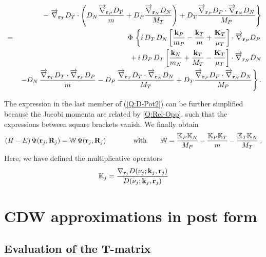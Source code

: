 \begin{eqnarray}
&&- \left. \overrightarrow{\nabla}_{\mathbf{r}_{T}} D_{T} \cdot \left(D_{N}
\frac{\overrightarrow{\nabla}_{\mathbf{r}_{P}}D_{P}}{m} + D_{P} \frac{
\overrightarrow{\nabla}_{\mathbf{r}_{N}} D_{N}}{M_{T}} \right)+ D_{T}
\frac{\overrightarrow{\nabla}_{\mathbf{r}_{P}} D_{P} \cdot
\overrightarrow{\nabla}_{\mathbf{r}_{N}}D_{N}}{M_{P}} \right\} \nonumber
\\
&=& \Phi \, \left\{i \, D_{T} \,  D_{N} \left[ \frac{
\mathbf{k}_{P}}{m_{P}} - \frac{ \mathbf{k}_{T} }{m} + \frac{
\mathbf{K}_{T}}{\mu_{T}} \right] \cdot \overrightarrow{\nabla}_{\mathbf{r}_{P}}
D_{P} \right.\nonumber
\\
&&+ \, i \, D_{P} \, D_{T}\left[ \frac{\mathbf{k}_{N} }{m_{N}} +
\frac{\mathbf{k}_{T} }{M_{T}} - \frac{\mathbf{K}_{T} }{\mu_{T}} \right] \cdot
\overrightarrow{\nabla}_{\mathbf{r}_{N}} D_{N} \nonumber
\\
&& \left. - D_{N} \,\frac{\overrightarrow{\nabla}_{\mathbf{r}_{T}} D_{T}
\cdot \overrightarrow{\nabla}_{\mathbf{r}_{P}} D_{P}}{m} - D_{P}
\,\frac{\overrightarrow{\nabla}_{\mathbf{r}_{T}} D_{T} \cdot
\overrightarrow{\nabla}_{\mathbf{r}_{N}} D_{N}}{M_{T}} + D_{T}
\frac{\overrightarrow{\nabla}_{\mathbf{r}_{P}}D_{P} \cdot
\overrightarrow{\nabla}_{\mathbf{r}_{N}}D_{N}}{M_{P}} \right\} .\nonumber
\end{eqnarray}

The expression in the last member of (\ref{Q:D-Pot2}) can be further
simplified because the Jacobi momenta are related by \ref{Q:Rel-Opp},
such that the expressions between square brackets vanish. We finally
obtain
%
\begin{equation}\label{Q:D-Pot}
\left( H - E \right) \Psi(\mathbf{r}_{j}, \mathbf{R}_{j}) = \mathbb{W} \,
\Psi(\mathbf{r}_{j}, \mathbf{R}_{j}) \qquad \qquad \mbox{with}\qquad
\mathbb{W}= \frac{ \mathbb{K}_{P} \mathbb{K}_{N}}{M_{P}}
-\frac{\mathbb{K}_{P} \mathbb{K}_{T}}{m} - \frac{\mathbb{K}_{T}
\mathbb{K}_{N}}{M_{T}} \;.
\end{equation}
%
Here, we have defined the multiplicative operators
\[
\mathbb{K}_{j} = \frac{\nabla_{\mathbf{r}_{j}}
D(\nu_{j};\mathbf{k}_{j},\mathbf{r}_{j})}{D(\nu_{j};\mathbf{k}_{j},\mathbf{r}_{j})}
\]


\section{CDW approximations in post form}
\label{S:appro-post-form}

\subsection{Evaluation of the T-matrix}
\label{S:Evalu-T-mat}

